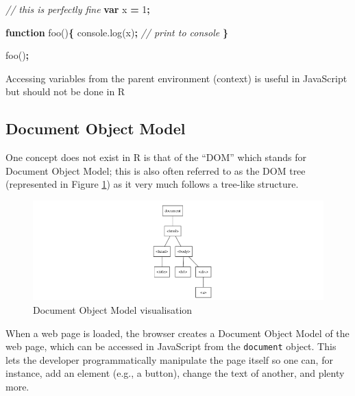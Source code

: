 \documentclass[10pt,]{krantz}
\makeatletter
\newenvironment{Shaded}{\begin{snugshade}}{\end{snugshade}}
\newcommand{\AttributeTok}[1]{\textcolor[rgb]{0.61,0.61,0.61}{#1}}
\newcommand{\CommentTok}[1]{\textcolor[rgb]{0.37,0.37,0.37}{\textit{#1}}}
\newcommand{\DecValTok}[1]{\textcolor[rgb]{0.06,0.06,0.06}{#1}}
\newcommand{\KeywordTok}[1]{\textcolor[rgb]{0.27,0.27,0.27}{\textbf{#1}}}
\newcommand{\NormalTok}[1]{#1}
\newcommand{\OperatorTok}[1]{\textcolor[rgb]{0.43,0.43,0.43}{\textbf{#1}}}
\newcommand{\VariableTok}[1]{\textcolor[rgb]{0,0,0}{#1}}
\newenvironment{kframe}{%
\medskip{}
\setlength{\fboxsep}{.8em}
 \def\at@end@of@kframe{}%
 \ifinner\ifhmode%
  \def\at@end@of@kframe{\end{minipage}}%
  \begin{minipage}{\columnwidth}%
 \fi\fi%
 \def\FrameCommand##1{\hskip\@totalleftmargin \hskip-\fboxsep
 \colorbox{shadecolor}{##1}\hskip-\fboxsep
     \hskip-\linewidth \hskip-\@totalleftmargin \hskip\columnwidth}%
 \MakeFramed {\advance\hsize-\width
   \@totalleftmargin\z@ \linewidth\hsize
   \@setminipage}}%
 {\par\unskip\endMakeFramed%
 \at@end@of@kframe}
\renewenvironment{Shaded}{\begin{kframe}}{\end{kframe}}
\newenvironment{rmdblock}[1]
  {
  \begin{itemize}
  \renewcommand{\labelitemi}{
    \raisebox{-.7\height}[0pt][0pt]{
      {\setkeys{Gin}{width=3em,keepaspectratio}\texttt{[image: images/\#1]}}
    }
  }
  \setlength{\fboxsep}{1em}
  \begin{kframe}
  \item
  }
  {
  \end{kframe}
  \end{itemize}
  }
\newenvironment{rmdnote}
  {\begin{rmdblock}{note}}
  {\end{rmdblock}}
\makeatother
\begin{document}
\begin{Shaded}
\begin{Highlighting}[]
\CommentTok{// this is perfectly fine}
\KeywordTok{var}\NormalTok{ x }\OperatorTok{=} \DecValTok{1}\OperatorTok{;}

\KeywordTok{function} \AttributeTok{foo}\NormalTok{()}\OperatorTok{\{}
  \VariableTok{console}\NormalTok{.}\AttributeTok{log}\NormalTok{(x)}\OperatorTok{;} \CommentTok{// print to console}
\OperatorTok{\}}

\AttributeTok{foo}\NormalTok{()}\OperatorTok{;}
\end{Highlighting}
\end{Shaded}

\begin{rmdnote}
Accessing variables from the parent environment (context) is useful in
JavaScript but should not be done in R
\end{rmdnote}

\hypertarget{basics-object-model}{%
\subsection{Document Object Model}\label{basics-object-model}}

One concept does not exist in R is that of the ``DOM'' which stands for Document Object Model; this is also often referred to as the DOM tree (represented in Figure \ref{fig:dom-viz}) as it very much follows a tree-like structure.

\begin{figure}[H]

{\centering \includegraphics[width=1\linewidth]{images/02-dom-viz} 

}

\caption{Document Object Model visualisation}\label{fig:dom-viz}
\end{figure}

When a web page is loaded, the browser creates a Document Object Model of the web page, which can be accessed in JavaScript from the \texttt{document} object. This lets the developer programmatically manipulate the page itself so one can, for instance, add an element (e.g., a button), change the text of another, and plenty more.
\end{document}
